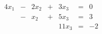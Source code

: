 \documentclass[varwidth=true]{standalone}
\begin{document}
\begin{alignat*}{4}
    x_1 & - & 2x_2 & + & 3x_3 &= & 0 \\
        & - &  x_2 & + & 5x_3 &= & 3 \\
        &   &      &   & 11x_3 &= & -2
\end{alignat*}
\end{document}
